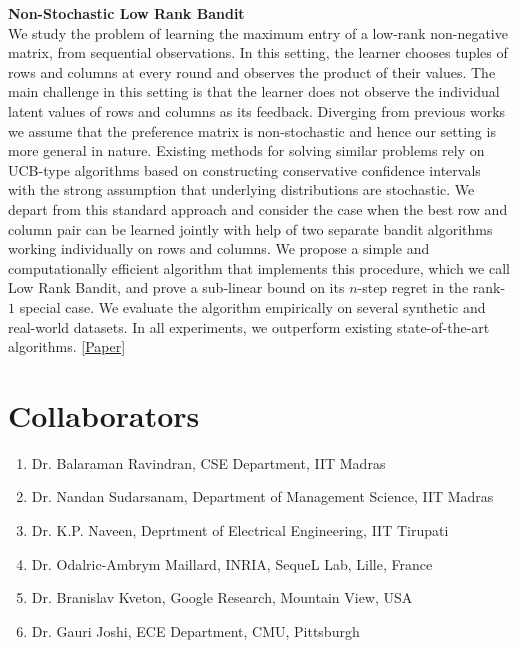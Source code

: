\documentclass[margin,11pt]{res}
\begin{document}
\begin{resume}
\textbf{Non-Stochastic Low Rank Bandit}\\
We study the problem of learning the maximum entry of a low-rank non-negative matrix, from sequential observations. In this setting, the learner chooses tuples of rows and columns at every round and observes the product of their values. The main challenge in this setting is that the learner does not observe the individual latent values of rows and columns as its feedback. Diverging from previous works we assume that the preference matrix is non-stochastic and hence our setting is more general in nature. Existing methods for solving similar problems rely on UCB-type algorithms based on constructing conservative confidence intervals with the strong assumption that underlying distributions are stochastic. We depart from this standard approach and consider the case when the best row and column pair can be learned jointly with help of two separate bandit algorithms working individually on rows and columns. We propose a simple and computationally efficient algorithm that implements this procedure, which we call Low Rank Bandit, and prove a sub-linear bound on its $n$-step regret in the rank-$1$ special case. We evaluate the algorithm empirically on several synthetic and real-world datasets. In all experiments, we outperform existing state-of-the-art algorithms. \href{https://github.com/Subhojyoti/Latent_Bandits/blob/master/IJCAI2019/bandit_paper.pdf}{[Paper]}


\section{Collaborators}
\begin{enumerate}
\item Dr. Balaraman Ravindran, CSE Department, IIT Madras
\item Dr. Nandan Sudarsanam, Department of Management Science, IIT Madras
\item Dr. K.P. Naveen, Deprtment of Electrical Engineering, IIT Tirupati
\item Dr. Odalric-Ambrym Maillard, INRIA, SequeL Lab, Lille, France
\item Dr. Branislav Kveton, Google Research, Mountain View, USA
\item Dr. Gauri Joshi, ECE Department, CMU, Pittsburgh
\end{enumerate}


\end{resume}
\end{document}
